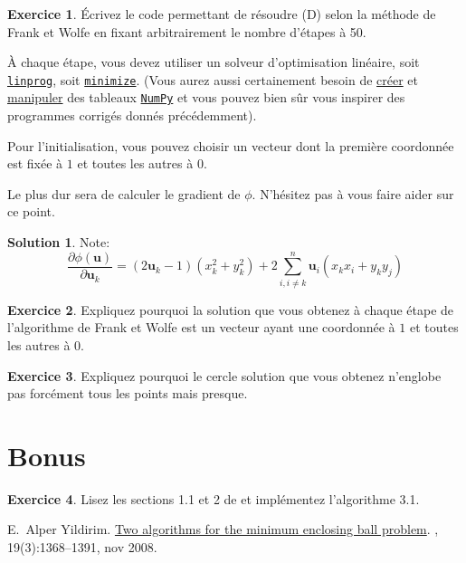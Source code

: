 \documentclass[a4paper,francais]{article}
\theoremstyle{definition}
\newtheorem{exercice}{Exercice}[section]
\newtheorem*{solution}{Solution}
\let\vec\mathbf
\begin{document}
\begin{exercice}
  \'Ecrivez le code permettant de résoudre (D) selon la méthode de Frank et Wolfe en fixant
  arbitrairement le nombre d'étapes à 50.
  
  \`A chaque étape, vous devez utiliser un solveur d'optimisation linéaire, soit
  \href{https://docs.scipy.org/doc/scipy-1.3.3/reference/generated/scipy.optimize.linprog.html#scipy.optimize.linprog}{\texttt{linprog}}, 
  soit \href{https://docs.scipy.org/doc/scipy-1.3.3/reference/generated/scipy.optimize.minimize.html}{\texttt{minimize}}.
  (Vous aurez aussi certainement besoin de
  \href{https://docs.scipy.org/doc/numpy/reference/routines.array-creation.html}{créer} et
  \href{https://docs.scipy.org/doc/numpy/reference/routines.array-manipulation.html}{manipuler} des
  tableaux
  \href{https://numpy.org/doc/stable/contents.html#numpy-docs-mainpage}{\texttt{NumPy}}
  et vous pouvez bien sûr vous inspirer des programmes corrigés donnés précédemment).
  
  Pour l'initialisation, vous pouvez choisir un vecteur dont la première coordonnée est fixée à $1$
  et toutes les autres à $0$.

  Le plus dur sera de calculer le gradient de $\phi$. N'hésitez pas à vous faire aider sur ce point. 
\end{exercice}

\begin{solution}
  Note:
  \[
  \frac{\partial \phi(\vec{u})}{\partial \vec{u}_k} =
  (2\vec{u}_k - 1)(x_k^2+y_k^2) + 2 \sum_{i, i \neq k}^n \vec{u}_i (x_kx_i + y_ky_j)
  \]
\end{solution}

\begin{exercice}
  Expliquez pourquoi la solution que vous obtenez à chaque étape de l'algorithme de Frank et Wolfe est
  un vecteur ayant une coordonnée à $1$ et toutes les autres à $0$. 
\end{exercice}

\begin{exercice}
  Expliquez pourquoi le cercle solution que vous obtenez n'englobe pas forcément tous les points mais presque.
\end{exercice}

\section{Bonus}

\begin{exercice}
  Lisez les sections 1.1 et 2 de \cite{yildirim} et implémentez l'algorithme 3.1. 
\end{exercice}

\begin{thebibliography}{1}

E.~Alper Yildirim.
\newblock \href{http://www.optimization-online.org/DB_FILE/2007/05/1654.pdf}{Two algorithms for the minimum enclosing ball problem}.
, 19(3):1368–1391, nov 2008.

\end{thebibliography}
\end{document}
